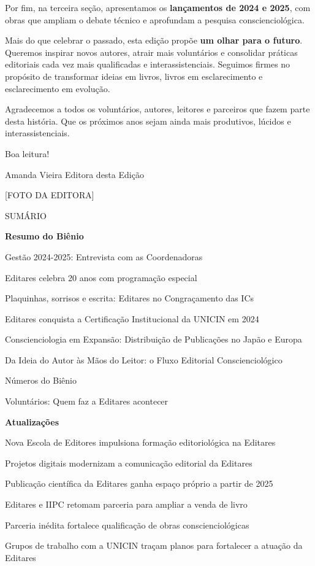 \documentclass[
]{article}
\begin{document}
Por fim, na terceira seção, apresentamos os \textbf{lançamentos de 2024 e 2025}, com obras que ampliam o debate técnico e aprofundam a pesquisa conscienciológica.

Mais do que celebrar o passado, esta edição propõe \textbf{um olhar para o futuro}. Queremos inspirar novos autores, atrair mais voluntários e consolidar práticas editoriais cada vez mais qualificadas e interassistenciais. Seguimos firmes no propósito de transformar ideias em livros, livros em esclarecimento e esclarecimento em evolução.

Agradecemos a todos os voluntários, autores, leitores e parceiros que fazem parte desta história. Que os próximos anos sejam ainda mais produtivos, lúcidos e interassistenciais.

Boa leitura!

Amanda Vieira\textbf{\hfill\break
} Editora desta Edição

{[}FOTO DA EDITORA{]}

SUMÁRIO

\textbf{Resumo do Biênio}

Gestão 2024-2025: Entrevista com as Coordenadoras

Editares celebra 20 anos com programação especial

Plaquinhas, sorrisos e escrita: Editares no Congraçamento das ICs

Editares conquista a Certificação Institucional da UNICIN em 2024

Conscienciologia em Expansão: Distribuição de Publicações no Japão e Europa

Da Ideia do Autor às Mãos do Leitor: o Fluxo Editorial Conscienciológico

Números do Biênio

Voluntários: Quem faz a Editares acontecer

\textbf{Atualizações}

Nova Escola de Editores impulsiona formação editoriológica na Editares

Projetos digitais modernizam a comunicação editorial da Editares

Publicação científica da Editares ganha espaço próprio a partir de 2025

Editares e IIPC retomam parceria para ampliar a venda de livro

Parceria inédita fortalece qualificação de obras conscienciológicas

Grupos de trabalho com a UNICIN traçam planos para fortalecer a atuação da Editares
\end{document}
